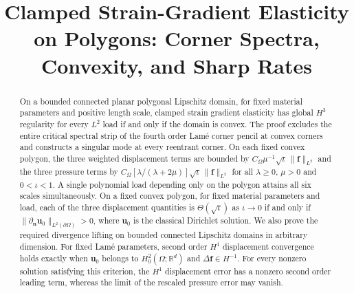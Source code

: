 \documentclass[10pt]{amsart}
\numberwithin{equation}{section}
\begin{document}
\title[Clamped strain gradient elasticity on polygons]
{Clamped Strain-Gradient Elasticity on Polygons: Corner Spectra, Convexity, and Sharp Rates}





\begin{abstract}
On a bounded connected planar polygonal Lipschitz domain, for fixed material parameters and positive length scale, clamped strain gradient elasticity has global $H^3$ regularity for every $L^2$ load if and only if the domain is convex. The proof excludes the entire critical spectral strip of the fourth order Lam\'e corner pencil at convex corners and constructs a singular mode at every reentrant corner. On each fixed convex polygon, the three weighted displacement terms are bounded by $C_\Omega\mu^{-1}\sqrt\iota\,\|\boldsymbol f\|_{L^2}$ and the three pressure terms by $C_\Omega[\lambda/(\lambda+2\mu)]\sqrt\iota\,\|\boldsymbol f\|_{L^2}$ for all $\lambda\geq0$, $\mu>0$ and $0<\iota<1$. A single polynomial load depending only on the polygon attains all six scales simultaneously. On a fixed convex polygon, for fixed material parameters and load, each of the three displacement quantities is $\Theta(\sqrt\iota)$ as $\iota\to0$ if and only if $\|\partial_{\boldsymbol n}\boldsymbol u_0\|_{L^2(\partial\Omega)}>0$, where $\boldsymbol u_0$ is the classical Dirichlet solution. We also prove the required divergence lifting on bounded connected Lipschitz domains in arbitrary dimension. For fixed Lam\'e parameters, second order $H^1$ displacement convergence holds exactly when $\boldsymbol u_0$ belongs to $H_0^2(\Omega;\mathbb R^d)$ and $\Delta\boldsymbol f\in H^{-1}$. For every nonzero solution satisfying this criterion, the $H^1$ displacement error has a nonzero second order leading term, whereas the limit of the rescaled pressure error may vanish.
\end{abstract}

\end{document}

